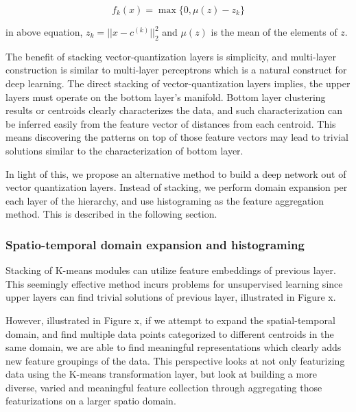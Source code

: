 \documentclass{article}
\begin{document}
\begin{equation}
f_k(x) = \max \{0, \mu(z) - z_k\} 
\end{equation} 

in above equation, $z_k=||x-c^{(k)}||_2^2$ and $\mu(z)$ is the mean of the elements of $z$. 

The benefit of stacking vector-quantization layers is simplicity, and multi-layer construction 
is similar to multi-layer perceptrons which is a natural construct for deep learning. 
The direct stacking of vector-quantization layers implies, the upper layers must operate 
on the bottom layer's manifold. Bottom layer 
clustering results or centroids clearly characterizes the data, and such characterization 
can be inferred easily from the feature vector of distances from each centroid. This means 
discovering the patterns on top of those feature vectors may lead to trivial solutions similar to 
the characterization of bottom layer. 

In light of this, we propose an alternative method to build a deep network out of vector quantization 
layers. Instead of stacking, we perform domain expansion per each layer of the hierarchy, and 
use histograming as the feature aggregation method. This is described in the following section. 

\subsubsection{Spatio-temporal domain expansion and histograming} 
Stacking of K-means modules can utilize feature embeddings of previous layer. This seemingly effective method incurs problems 
for unsupervised learning since upper layers can find trivial solutions of previous layer, illustrated in Figure x. 


However, illustrated in Figure x, if we attempt to expand the spatial-temporal domain, and find multiple data points categorized to different centroids in the same domain, we are able to find meaningful representations which clearly adds new feature groupings of the data. 
This perspective looks at not only featurizing data using the K-means transformation layer, but look at building a more diverse, varied and meaningful feature collection through aggregating those featurizations on a larger spatio domain. 
\end{document}

